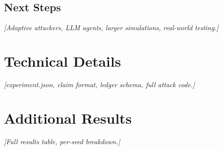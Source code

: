 \documentclass[a4paper, 11pt]{article}
\begin{document}
\subsection{Next Steps}
\label{subsec:next-steps}
\textit{[Adaptive attackers, LLM agents, larger simulations, real-world testing.]}

\newpage




\newpage

\appendix
\section{Technical Details}
\textit{[experiment.json, claim format, ledger schema, full attack code.]}

\section{Additional Results}
\textit{[Full results table, per-seed breakdown.]}
\end{document}
